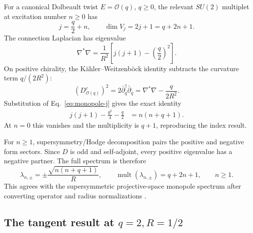 \documentclass[11pt]{article}
\theoremstyle{definition}
\theoremstyle{remark}
\newcommand{\cO}{\mathcal O}
\begin{document}
For a canonical Dolbeault twist \(E=\cO(q)\), \(q\ge0\), the relevant
\(SU(2)\) multiplet at excitation number \(n\ge0\) has
\begin{equation}
 j=\frac q2+n,
 \qquad \dim V_j=2j+1=q+2n+1.
 \label{eq:monopole-j}
\end{equation}
The connection Laplacian has eigenvalue
\begin{equation}
 \nabla^*\nabla
 =\frac1{R^2}\left[j(j+1)-\left(\frac q2\right)^2\right].
 \label{eq:bochner-spectrum}
\end{equation}
On positive chirality, the K\"ahler--Weitzenb\"ock identity subtracts the
curvature term \(q/(2R^2)\):
\begin{equation}
 (D^c_{\cO(q)})^2
 =2\bar\partial_q^\dagger\bar\partial_q
 =\nabla^*\nabla-\frac{q}{2R^2}.
 \label{eq:weitzenbock}
\end{equation}
Substitution of Eq.~\eqref{eq:monopole-j} gives the exact identity
\begin{align}
 j(j+1)-\frac{q^2}{4}-\frac q2
 &=n(n+q+1).
 \label{eq:casimir-identity}
\end{align}
At \(n=0\) this vanishes and the multiplicity is \(q+1\), reproducing the
index result.

For \(n\ge1\), supersymmetry/Hodge decomposition pairs the positive and
negative form sectors.  Since \(D\) is odd and self-adjoint, every positive
eigenvalue has a negative partner.  The full spectrum is therefore
\begin{equation}
 \boxed{
 \lambda_{n,\pm}=\pm\frac{\sqrt{n(n+q+1)}}{R},\qquad
 \operatorname{mult}(\lambda_{n,\pm})=q+2n+1,\qquad n\ge1.}
 \label{eq:full-q-spectrum}
\end{equation}
This agrees with the supersymmetric projective-space monopole spectrum after
converting operator and radius normalizations \cite{BykovSmilga2023APE4}.

\subsection{The tangent result at \texorpdfstring{\(q=2,R=1/2\)}{q=2,R=1/2}}
\end{document}

